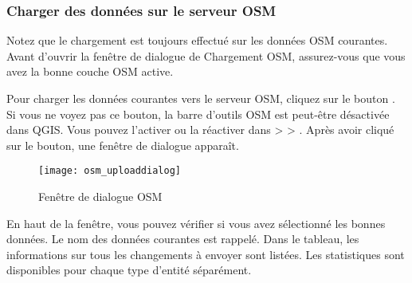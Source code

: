 \subsubsection{Charger des données sur le serveur OSM}  

Notez que le chargement est toujours effectué sur les données OSM courantes. Avant d'ouvrir la fenêtre de dialogue de Chargement OSM, assurez-vous que vous avez la bonne couche OSM active.

Pour charger les données courantes vers le serveur OSM, cliquez sur le bouton . Si vous ne voyez pas ce bouton, la barre d'outils OSM est peut-être désactivée dans QGIS. Vous pouvez l'activer ou la réactiver dans  >  > . Après avoir cliqué sur le bouton, une fenêtre de dialogue apparaît.

\begin{figure}[ht]
   \begin{center}
   \caption{Fenêtre de dialogue OSM \nixcaption}\label{fig:osmupload}\smallskip
   \texttt{[image: osm\_uploaddialog]}
\end{center}
\end{figure}

En haut de la fenêtre, vous pouvez vérifier si vous avez sélectionné les bonnes données. Le nom des données courantes est rappelé. Dans le tableau, les informations sur tous les changements à envoyer sont listées. Les statistiques sont disponibles pour chaque type d'entité séparément.

